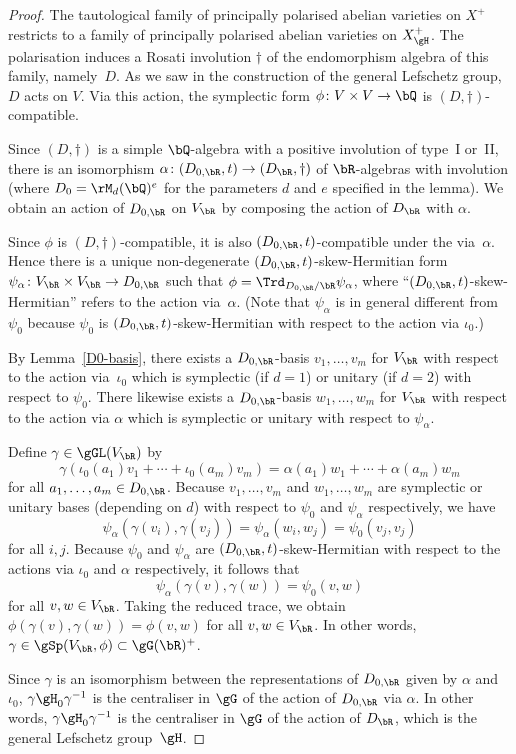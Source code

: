 \begin{proof}
The tautological family of principally polarised abelian varieties on $X^+$ restricts to a family of principally polarised abelian varieties on $X_\gH^+$.
The polarisation induces a Rosati involution $\dag$ of the endomorphism algebra of this family, namely~$D$.
As we saw in the construction of the general Lefschetz group, $D$ acts on $V$.
Via this action, the symplectic form $\phi \colon V \times V \to \bQ$ is $(D,\dag)$-compatible.

Since $(D,\dag)$ is a simple $\bQ$-algebra with a positive involution of type~I or~II, there is an isomorphism $\alpha \colon (D_{0,\bR},t) \to (D_\bR,\dag)$ of $\bR$-algebras with involution (where $D_0 = \rM_d(\bQ)^e$ for the parameters $d$ and $e$ specified in the lemma).
We obtain an action of $D_{0,\bR}$ on $V_\bR$ by composing the action of $D_\bR$ with $\alpha$.

Since $\phi$ is $(D,\dag)$-compatible, it is also $(D_{0,\bR},t)$-compatible under the via~$\alpha$.
Hence there is a unique non-degenerate $(D_{0,\bR},t)$-skew-Hermitian form $\psi_\alpha \colon V_\bR \times V_\bR \to D_{0,\bR}$ such that $\phi = \Trd_{D_{0,\bR}/\bR} \psi_\alpha$, where ``$(D_{0,\bR},t)$-skew-Hermitian'' refers to the action via~$\alpha$.
(Note that $\psi_\alpha$ is in general different from $\psi_0$ because $\psi_0$ is $(D_{0,\bR},t)$-skew-Hermitian with respect to the action via $\iota_0$.)

By Lemma~\ref{D0-basis}, there exists a $D_{0,\bR}$-basis $v_1, \dotsc, v_m$ for $V_\bR$ with respect to the action via~$\iota_0$ which is symplectic (if $d=1$) or unitary (if $d=2$) with respect to $\psi_0$.
There likewise exists a $D_{0,\bR}$-basis $w_1, \dotsc, w_m$ for $V_\bR$ with respect to the action via $\alpha$ which is symplectic or unitary with respect to $\psi_\alpha$.

Define $\gamma \in \gGL(V_\bR)$ by
\[
\gamma(\iota_0(a_1)v_1 + \dotsb + \iota_0(a_m)v_m) = \alpha(a_1)w_1 + \dotsb + \alpha(a_m)w_m
\]
for all $a_1, \dotsc, a_m \in D_{0,\bR}$.
Because $v_1, \dotsc, v_m$ and $w_1, \dotsc, w_m$ are symplectic or unitary bases (depending on $d$) with respect to $\psi_0$ and $\psi_\alpha$ respectively, we have
\[
\psi_\alpha(\gamma(v_i), \gamma(v_j)) = \psi_\alpha(w_i, w_j) = \psi_0(v_j, v_j)
\]
for all $i, j$.
Because $\psi_0$ and $\psi_\alpha$ are $(D_{0,\bR},t)$-skew-Hermitian with respect to the actions via $\iota_0$ and $\alpha$ respectively, it follows that
\[
\psi_\alpha(\gamma(v), \gamma(w)) = \psi_0(v, w)
\]
for all $v, w \in V_\bR$.
Taking the reduced trace, we obtain $\phi(\gamma(v), \gamma(w)) = \phi(v, w)$ for all $v, w \in V_\bR$.
In other words, $\gamma \in \gSp(V_\bR, \phi) \subset \gG(\bR)^+$.

Since $\gamma$ is an isomorphism between the representations of $D_{0,\bR}$ given by $\alpha$ and~$\iota_0$, $\gamma \gH_0 \gamma^{-1}$ is the centraliser in $\gG$ of the action of $D_{0,\bR}$ via $\alpha$.
In other words, $\gamma \gH_0 \gamma^{-1}$ is the centraliser in $\gG$ of the action of $D_\bR$, which is the general Lefschetz group~$\gH$.
\end{proof}

